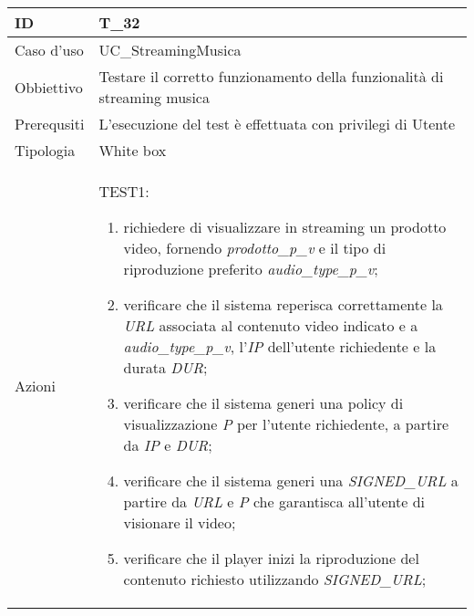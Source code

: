 \begin{table}[hb]
    \centering
    \begin{tabular}{ |p{2cm}|p{10cm}|  }
        \hline
        ID          & T\_32                                                                    \\\hline
        Caso d'uso  & UC\_StreamingMusica                                                      \\\hline
        Obbiettivo  & Testare il corretto funzionamento della funzionalità di streaming musica \\\hline
        Prerequsiti & L'esecuzione del test è effettuata con privilegi di Utente               \\\hline
        Tipologia   & White box                                                                \\\hline
        Azioni      &
        TEST1:
        \begin{enumerate}[nosep, topsep=0pt]
            \item richiedere di visualizzare in streaming un prodotto video, fornendo \emph{prodotto\_p\_v} e il tipo di riproduzione preferito \emph{audio\_type\_p\_v};
            \item verificare che il sistema reperisca correttamente la \emph{URL} associata al contenuto video indicato e a \emph{audio\_type\_p\_v}, l'\emph{IP} dell'utente richiedente e la durata \emph{DUR};
            \item verificare che il sistema generi una policy di visualizzazione \emph{P} per l'utente richiedente, a partire da \emph{IP} e \emph{DUR};
            \item verificare che il sistema generi una \emph{SIGNED\_URL} a partire da \emph{URL} e \emph{P} che garantisca all'utente di visionare il video;
            \item verificare che il player inizi la riproduzione del contenuto richiesto utilizzando \emph{SIGNED\_URL};
        \end{enumerate}
        \\\hline
    \end{tabular}
\end{table}


